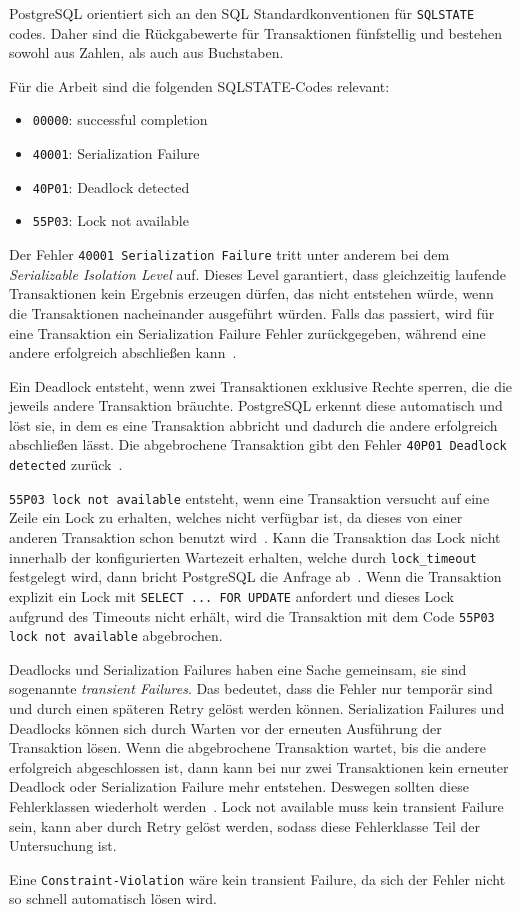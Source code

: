 
PostgreSQL orientiert sich an den SQL Standardkonventionen für \texttt{SQLSTATE} codes.
Daher sind die Rückgabewerte für Transaktionen fünfstellig und bestehen sowohl aus Zahlen, als auch aus Buchstaben.

Für die Arbeit sind die folgenden SQLSTATE-Codes relevant:
\begin{itemize}
	\item \texttt{00000}: successful completion
	\item \texttt{40001}: Serialization Failure
	\item \texttt{40P01}: Deadlock detected
	\item \texttt{55P03}: Lock not available
\end{itemize}
Der Fehler \texttt{40001 Serialization Failure} tritt unter anderem bei dem \emph{Serializable Isolation Level} auf.
Dieses Level garantiert, dass gleichzeitig laufende Transaktionen kein Ergebnis erzeugen dürfen, das nicht entstehen
würde, wenn die Transaktionen nacheinander ausgeführt würden.
Falls das passiert, wird für eine Transaktion ein Serialization Failure Fehler zurückgegeben, während eine andere
erfolgreich abschließen kann~\cite{PostgreSQLSerializable}.

Ein Deadlock entsteht, wenn zwei Transaktionen exklusive Rechte sperren, die die jeweils andere Transaktion bräuchte.
PostgreSQL erkennt diese automatisch und löst sie, in dem es eine Transaktion abbricht und dadurch die andere
erfolgreich abschließen lässt.
Die abgebrochene Transaktion gibt den Fehler \texttt{40P01 Deadlock detected} zurück~\cite{PostgreSQLDeadlocks}.

\texttt{55P03 lock not available} entsteht, wenn eine Transaktion versucht auf eine Zeile ein Lock zu erhalten,
welches nicht verfügbar ist, da dieses von einer anderen Transaktion schon benutzt wird~\cite{PostgreSQLRowLocks}.
Kann die Transaktion das Lock nicht innerhalb der konfigurierten Wartezeit erhalten, welche durch
\texttt{lock\_timeout} festgelegt wird, dann bricht PostgreSQL die Anfrage ab~\cite{PostgreSQLClientDefaults}.
Wenn die Transaktion explizit ein Lock mit \texttt{SELECT ... FOR UPDATE} anfordert und dieses Lock aufgrund des
Timeouts nicht erhält, wird die Transaktion mit dem Code \texttt{55P03 lock not available} abgebrochen.

Deadlocks und Serialization Failures haben eine Sache gemeinsam, sie sind sogenannte \emph{transient Failures}.
Das bedeutet, dass die Fehler nur temporär sind und durch einen späteren Retry gelöst werden können.
Serialization Failures und Deadlocks können sich durch Warten vor der erneuten Ausführung der Transaktion lösen.
Wenn die abgebrochene Transaktion wartet, bis die andere erfolgreich abgeschlossen ist, dann kann bei nur zwei
Transaktionen kein erneuter Deadlock oder Serialization Failure mehr entstehen.
Deswegen sollten diese Fehlerklassen wiederholt werden~\cite{MicrosoftRetryPattern}.
Lock not available muss kein transient Failure sein, kann aber durch Retry gelöst werden, sodass diese Fehlerklasse
Teil der Untersuchung ist.

Eine \texttt{Constraint-Violation} wäre kein transient Failure, da sich der Fehler nicht so schnell automatisch lösen
wird.
